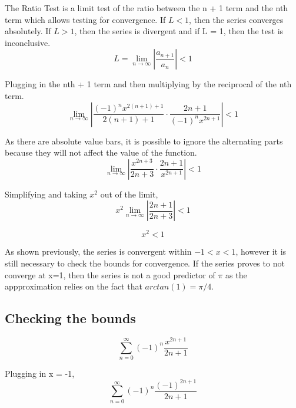 \documentclass[12pt, titlepage]{article}
\begin{document}
The Ratio Test is a limit test of the ratio between the n + 1 term and the nth term which allows testing for convergence. If \(L < 1\), then the series converges absolutely. If \(L > 1\), then the series is divergent and if L = 1, then the test is inconclusive.
\begin{equation*}
    L = \lim_{n \to \infty} \left |\frac{a_{n+1}}{a_{n}} \right | < 1
\end{equation*}

Plugging in the nth + 1 term and then multiplying by the reciprocal of the nth term.
\begin{equation*}
    \lim_{n \to \infty} \left |\frac{(-1)^{n}x^{2(n+1)+1}}{2(n+1)+1} \cdot \frac{2n+1}{(-1)^{n}x^{2n+1}} \right | < 1
\end{equation*}

As there are absolute value bars, it is possible to ignore the alternating parts because they will not affect the value of the function.
\begin{equation*}
    \lim_{n \to \infty} \left |\frac{x^{2n+3}}{2n+3} \cdot \frac{2n+1}{x^{2n+1}} \right | < 1
\end{equation*}

Simplifying and taking \(x^{2}\) out of the limit,
\begin{equation*}
    x^{2} \lim_{n \to \infty} \left |\frac{2n+1}{2n+3} \right | < 1
\end{equation*}

\begin{equation*}
    x^{2} < 1
\end{equation*}

As shown previously, the series is convergent within \(-1 < x < 1\), however it is still necessary to check the bounds for convergence. If the series proves to not converge at x=1, then the series is not a good predictor of \(\pi\) as the appproximation relies on the fact that \(arctan(1) = \pi/4\).

\subsection{Checking the bounds}
\begin{equation*}
    \sum_{n=0}^{\infty} (-1)^{n} \frac{x^{2n+1}}{2n+1}
\end{equation*}

Plugging in x = -1,
\begin{equation*}
    \sum_{n=0}^{\infty} (-1)^{n} \frac{(-1)^{2n+1}}{2n+1}
\end{equation*}
\end{document}
